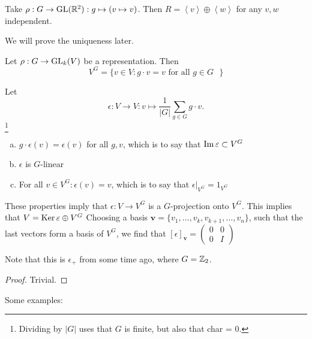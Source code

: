 \begin{eg}
    Take $\rho: G \to \operatorname{GL}(\mathbb{R}^2): g \mapsto (v \mapsto v)$.
    Then $R = \left< v\right> \oplus \left<w \right>$ for any $v, w$ independent.
\end{eg}

We will prove the uniqueness later.


\begin{definition}
    Let $\rho: G \to  \operatorname{GL}_k(V)$ be a representation.
    Then \[
    V^{G} = \{v \in V: g\cdot v = v \text{ for all $g \in G$ }\} 
\]
\end{definition}

\begin{prop}[2.15]
    Let \[
        \epsilon: V \to  V: v \mapsto \frac{1}{|G|} \sum_{g \in G} g\cdot v.
    \]\footnote{Dividing by  $|G|$ uses that  $G$ is finite, but also that char = 0.}

    \begin{enumerate}[(a)]
        \item $g\cdot  \epsilon(v) = \epsilon(v)$ for all $g, v$, which is to say that $\operatorname{Im} \varepsilon \subset V^{G}$
        \item $\epsilon$ is $G$-linear
        \item For all $v \in V^{G}: \epsilon(v) = v$, which is to say that $\epsilon|_{V^{G}} = 1_{V^{G}}$
    \end{enumerate}
    These properties imply that $\epsilon: V \to  V^{G}$ is a $G$-projection onto $V^{G}$.
    This implies that $V = \operatorname{Ker} \varepsilon \oplus V^{G}$
    Choosing a basis $\mathbf{v} = \{v_1, \ldots, v_k, v_{k+1}, \ldots, v_n\}$, such that the last vectors form a basis of $V^{G}$, we find that 
    $[\epsilon]_{\mathbf{v}} = \begin{pmatrix}
        0 & 0 \\
        0 & I
    \end{pmatrix}$
\end{prop}

\begin{remark}
    Note that this is $\epsilon_+$ from some time ago, where  $G = \mathbb{Z}_2$.
\end{remark}
\begin{proof}
    Trivial.
\end{proof}


Some examples:

